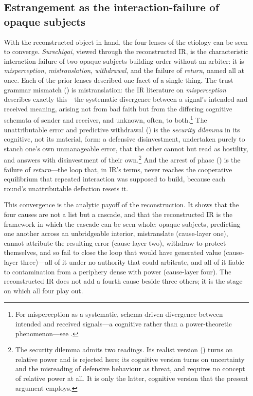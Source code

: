 \subsection{Estrangement as the interaction-failure of opaque subjects}
\label{p17:sub:ir-failure}

With the reconstructed object in hand, the four lenses of the etiology can be seen to converge. \emph{Surechigai}, viewed through the reconstructed IR, is the characteristic interaction-failure of two opaque subjects building order without an arbiter: it is \emph{misperception}, \emph{mistranslation}, \emph{withdrawal}, and the failure of \emph{return}, named all at once. Each of the prior lenses described one facet of a single thing. The trust-grammar mismatch () is mistranslation: the IR literature on \emph{misperception} describes exactly this---the systematic divergence between a signal's intended and received meaning, arising not from bad faith but from the differing cognitive schemata of sender and receiver, and unknown, often, to both.\footnote{For misperception as a systematic, schema-driven divergence between intended and received signals---a cognitive rather than a power-theoretic phenomenon---see \textcite{jervis1976}.} The unattributable error and predictive withdrawal () is the \emph{security dilemma} in its cognitive, not its material, form: a defensive disinvestment, undertaken purely to stanch one's own unmanageable error, that the other cannot but read as hostility, and answers with disinvestment of their own.\footnote{The security dilemma admits two readings. Its realist version (\cite{mearsheimer2001}) turns on relative power and is rejected here; its cognitive version turns on uncertainty and the misreading of defensive behaviour as threat, and requires no concept of relative power at all. It is only the latter, cognitive version that the present argument employs.} And the arrest of phase () is the failure of \emph{return}---the loop that, in IR's terms, never reaches the cooperative equilibrium that repeated interaction was supposed to build, because each round's unattributable defection resets it.

This convergence is the analytic payoff of the reconstruction. It shows that the four causes are not a list but a cascade, and that the reconstructed IR is the framework in which the cascade can be seen whole: opaque subjects, predicting one another across an unbridgeable interior, mistranslate (cause-layer one), cannot attribute the resulting error (cause-layer two), withdraw to protect themselves, and so fail to close the loop that would have generated value (cause-layer three)---all of it under no authority that could arbitrate, and all of it liable to contamination from a periphery dense with power (cause-layer four). The reconstructed IR does not add a fourth cause beside three others; it is the stage on which all four play out.

